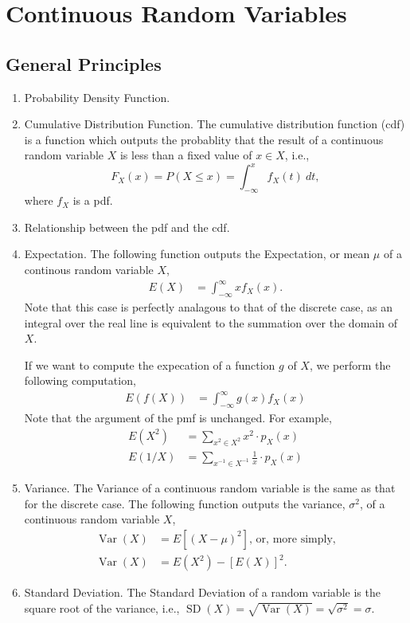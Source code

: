 \documentclass{amsproc}
\DeclareMathOperator{\Var}{\text{Var}}
\DeclareMathOperator{\SD}{\text{SD}}
\begin{document}
	\section{Continuous Random Variables}
		\subsection{General Principles}
			\begin{enumerate}
				\item Probability Density Function.
				
				\item Cumulative Distribution Function. The cumulative distribution function (cdf) is a function which outputs the probablity that the result of a continuous random variable $X$ is less than a fixed value of $x \in X$, i.e., $$F_{X}(x) = P(X \leq x) = \int_{-\infty}^{x} f_{X}(t) \ dt,$$ where $f_{X}$ is a pdf.

				\item Relationship between the pdf and the cdf.

				\item Expectation. The following function outputs the Expectation, or mean $\mu$ of a continous random variable $X$,
					\begin{align*}
						E(X) &= \int_{-\infty}^{\infty} x f_{X}(x).
					\end{align*}
				Note that this case is perfectly analagous to that of the discrete case, as an integral over the real line is equivalent to the summation over the domain of $X$.

				If we want to compute the expecation of a function $g$ of $X$, we perform the following computation,
					\begin{align*}
						E\left( f(X) \right) &= \int_{-\infty}^{\infty} g(x) f_{X}(x)
					\end{align*}
				Note that the argument of the pmf is unchanged. For example,
					\begin{align*}
						E\left(X^{2}\right) &= \sum\limits_{x^{2} \in X^{2}} x^{2} \cdot p_{X}(x) \\
						E\left(1/X\right) &= \sum\limits_{x^{-1} \in X^{-1}} \frac{1}{x} \cdot p_{X}(x)
					\end{align*}
				
				\item Variance. The Variance of a continuous random variable is the same as that for the discrete case. The following function outputs the variance, $\sigma^{2}$, of a continuous random variable $X$,
					\begin{align*}
						\Var(X) &= E\left[\left(X - \mu\right)^{2}\right]\text{, or, more simply,} \\
						\Var(X) &= E(X^{2}) - \left[E(X)\right]^{2}.
					\end{align*}
				
				\item Standard Deviation. The Standard Deviation of a random variable is the square root of the variance, i.e., $\SD(X) = \sqrt{\Var(X)} = \sqrt{\sigma^{2}} = \sigma$.
			\end{enumerate}
\end{document}
